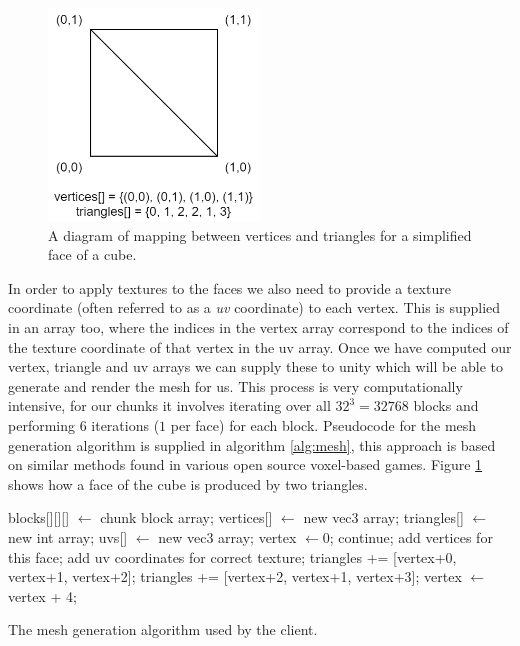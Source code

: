 \documentclass[10pt,twoside,notitlepage,a4paper]{report}
\begin{document}
	\begin{figure}
		\centering
		\includegraphics[width=0.5\textwidth]{diag2.png}
		\caption{A diagram of mapping between vertices and triangles for a simplified face of a cube.}
		\label{fig:mesh}
	\end{figure}
	
	In order to apply textures to the faces we also need to provide a texture coordinate (often referred to as a \emph{uv} coordinate) to each vertex. This is supplied in an array too, where the indices in the vertex array correspond to the indices of the texture coordinate of that vertex in the uv array. Once we have computed our vertex, triangle and uv arrays we can supply these to unity which will be able to generate and render the mesh for us. This process is very computationally intensive, for our chunks it involves iterating over all $32^3 = 32768$ blocks and performing $6$ iterations ($1$ per face) for each block. Pseudocode for the mesh generation algorithm is supplied in algorithm \ref{alg:mesh}, this approach is based on similar methods found in various open source voxel-based games. Figure \ref{fig:mesh} shows how a face of the cube is produced by two triangles.
	
	\begin{algorithm}
		\begin{algorithmic}
			\State blocks[][][] $\gets$ chunk block array;
			\State vertices[] $\gets$ new vec3 array;
			\State triangles[] $\gets$ new int array;
			\State uvs[] $\gets$ new vec3 array;
			\State vertex $\gets 0$;
								\State continue;
							\EndIf
							\State add vertices for this face;
							\State add uv coordinates for correct texture;
							\State triangles += [vertex+0, vertex+1, vertex+2];
							\State triangles += [vertex+2, vertex+1, vertex+3];
							\State vertex $\gets$ vertex + 4;
						\EndFor
					\EndFor
				\EndFor
			\EndFor
		\end{algorithmic}
		\caption{The mesh generation algorithm used by the client.}
		\label{alg:mesh}
	\end{algorithm}
	
\end{document}
